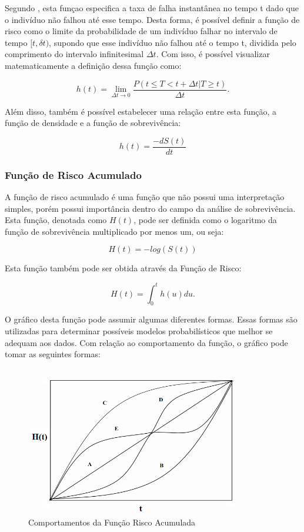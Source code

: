 \documentclass[a4paper,12pt]{article}
\begin{document}
Segundo \cite{Lawless}, esta funçao especifica a taxa de falha instantânea no tempo t dado que o indivíduo não falhou até esse tempo. Desta forma, é possível definir a função de risco como o limite da probabilidade de um indivíduo falhar no intervalo de tempo $[t, \delta t)$, supondo que esse indivíduo não falhou até o tempo t, dividida pelo comprimento do intervalo infinitesimal $\Delta t$. Com isso, é possível visualizar matematicamente a definição dessa função como:

\begin{equation} \label{eq:haz}
h(t) = \lim_{\Delta t \to 0}\dfrac{P(t \le T < t+\Delta t|T\ge t)}{\Delta t}.
\end{equation}

Além disso, também é possível estabelecer uma relação entre esta função, a função de densidade e a função de sobrevivência:

\begin{equation} \label{eq:haz_surv}
h(t) = \dfrac{-dS(t)}{dt}
\end{equation}


\subsubsection{Função de Risco Acumulado}

A função de risco acumulado é uma função que não possui uma interpretação simples, porém possui importância dentro do campo da análise de sobrevivência. Esta função, denotada como $H(t)$, pode ser definida como o logaritmo da função de sobrevivência multiplicado por menos um, ou seja:

\begin{equation} \label{eq:riskcum}
 H(t) = -log(S(t))
\end{equation}

Esta função também pode ser obtida através da Função de Risco:

\begin{equation} \label{eq:riskcum}
 H(t) = \int_0^t h(u)du.
\end{equation}

O gráfico desta função pode assumir algumas diferentes formas. Essas formas são utilizadas para determinar possíveis modelos probabilísticos que melhor se adequam aos dados. Com relação ao comportamento da função, o gráfico pode tomar as seguintes formas:
\begin{figure}[H]
  \centering
  \includegraphics[width=10cm]{risco_acum.png}
  \caption{Comportamentos da Função Risco Acumulada}
\end{figure}
\end{document}
